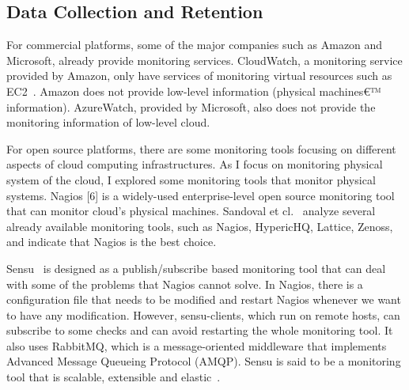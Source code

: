 \subsection{Data Collection and Retention}

For commercial platforms, some of the major companies such as Amazon and Microsoft, already provide monitoring services. CloudWatch, a monitoring service provided by Amazon, only have services of monitoring virtual resources such as EC2~\cite{Aceto2013}. Amazon does not provide low-level information (physical machines€™ information). AzureWatch, provided by Microsoft, also does not provide the monitoring information of low-level cloud. 

  For open source platforms, there are some monitoring tools focusing on different aspects of cloud computing infrastructures. As I focus on monitoring physical system of the cloud, I explored some monitoring tools that monitor physical systems. Nagios [6] is a widely-used enterprise-level open source monitoring tool that can monitor cloud's physical machines. Sandoval et cl.~\cite{sandoval2012evaluation} analyze several already available monitoring tools, such as Nagios, HypericHQ, Lattice, Zenoss, and indicate that Nagios is the best choice. 

  Sensu~\cite{sensu} is designed as a publish/subscribe based monitoring tool that can deal with some of the problems that Nagios cannot solve. In Nagios, there is a configuration file that needs to be modified and restart Nagios whenever we want to have any modification. However, sensu-clients, which run on remote hosts, can subscribe to some checks and can avoid restarting the whole monitoring tool. It also uses RabbitMQ, which is a message-oriented middleware that implements Advanced Message Queueing Protocol (AMQP). Sensu is said to be a monitoring tool that is scalable, extensible and elastic~\cite{Aceto2013}. 